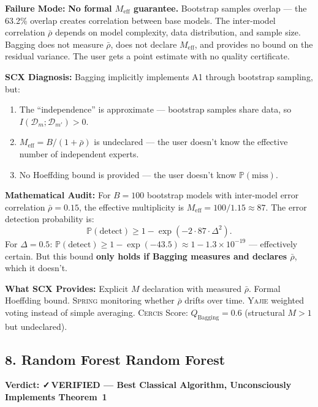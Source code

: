 \documentclass[12pt,a4paper]{article}
\theoremstyle{definition}
\newcommand{\verified}{{\color{verifiedcolor}\textbf{✓\,VERIFIED}}}
\newcommand{\Yajie}{\textsc{Yajie}}
\newcommand{\Spring}{\textsc{Spring}}
\newcommand{\Cercis}{\textsc{Cercis}}
\newcommand{\Pbb}{\mathbb{P}}
\newcommand{\cD}{\mathcal{D}}
\newcommand{\auditHeader}[1]{\medskip\noindent\textbf{\large #1}\medskip}
\newcommand{\whyFail}{\noindent\textbf{Failure Mode:} }
\newcommand{\whatMissing}{\noindent\textbf{What SCX Provides:} }
\newcommand{\diagnosis}{\noindent\textbf{SCX Diagnosis:} }
\newcommand{\mathAudit}{\noindent\textbf{Mathematical Audit:} }
\begin{document}
\whyFail{} \textbf{No formal $M_{\text{eff}}$ guarantee.} Bootstrap samples overlap — the 63.2\% overlap creates correlation between base models. The inter-model correlation $\bar{\rho}$ depends on model complexity, data distribution, and sample size. Bagging does not measure $\bar{\rho}$, does not declare $M_{\text{eff}}$, and provides no bound on the residual variance. The user gets a point estimate with no quality certificate.

\diagnosis{} Bagging implicitly implements A1 through bootstrap sampling, but:
\begin{enumerate}[nosep]
    \item The ``independence'' is approximate — bootstrap samples share data, so $I(\cD_m; \cD_{m'}) > 0$.
    \item $M_{\text{eff}} = B/(1+\bar{\rho})$ is undeclared — the user doesn't know the effective number of independent experts.
    \item No Hoeffding bound is provided — the user doesn't know $\Pbb(\text{miss})$.
\end{enumerate}

\mathAudit{} For $B=100$ bootstrap models with inter-model error correlation $\bar{\rho}=0.15$, the effective multiplicity is $M_{\text{eff}} = 100/1.15 \approx 87$. The error detection probability is:
\[
\Pbb(\text{detect}) \ge 1 - \exp(-2 \cdot 87 \cdot \Delta^2).
\]
For $\Delta = 0.5$: $\Pbb(\text{detect}) \ge 1 - \exp(-43.5) \approx 1 - 1.3 \times 10^{-19}$ — effectively certain. But this bound \textbf{only holds if Bagging measures and declares $\bar{\rho}$}, which it doesn't.

\whatMissing{} Explicit $M$ declaration with measured $\bar{\rho}$. Formal Hoeffding bound. \Spring{} monitoring whether $\bar{\rho}$ drifts over time. \Yajie{} weighted voting instead of simple averaging. \Cercis{} Score: $Q_{\text{Bagging}} = 0.6$ (structural $M>1$ but undeclared).

\subsection{8. Random Forest Random Forest}
\label{sec:random_forest}

\auditHeader{Verdict: \verified{} — Best Classical Algorithm, Unconsciously Implements Theorem~1}
\end{document}
